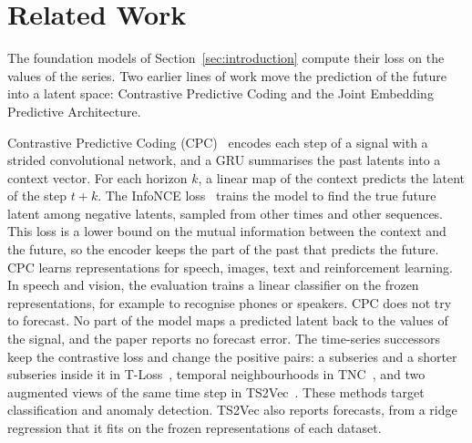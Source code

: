 \section{Related Work}
\label{sec:related-work}

The foundation models of Section~\ref{sec:introduction} compute their
loss on the values of the series. Two earlier lines of work move the
prediction of the future into a latent space: Contrastive Predictive
Coding and the Joint Embedding Predictive Architecture.

Contrastive Predictive Coding (CPC)~\citep{oord2018cpc} encodes each
step of a signal with a strided convolutional network, and a GRU
summarises the past latents into a context vector. For each horizon
$k$, a linear map of the context predicts the latent of the step
$t + k$. The InfoNCE loss~\citep{oord2018cpc} trains the model to
find the true future latent among negative latents, sampled from other
times and other sequences. This loss is a lower bound on the mutual
information between the context and the future, so the encoder keeps
the part of the past that predicts the future. CPC learns
representations for speech, images, text and reinforcement learning.
In speech and vision, the evaluation trains a linear classifier on the
frozen representations, for example to recognise phones or speakers.
CPC does not try to forecast. No part of the model maps a predicted
latent back to the values of the signal, and the paper reports no
forecast error. The time-series successors keep the contrastive loss
and change the positive pairs: a subseries and a shorter subseries
inside it in T-Loss~\citep{franceschi2019tloss}, temporal
neighbourhoods in TNC~\citep{tonekaboni2021tnc}, and two augmented
views of the same time step in TS2Vec~\citep{yue2022ts2vec}. These
methods target classification and anomaly detection. TS2Vec also
reports forecasts, from a ridge regression that it fits on the frozen
representations of each dataset.

